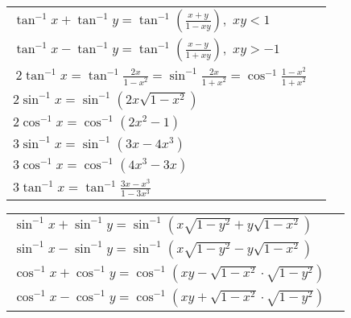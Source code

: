 \documentclass[Math.tex]{subfiles}
\begin{document}
\begin{tabular}{|l|N}
\hline
$\displaystyle\tan^{-1} x + \tan ^{-1} y = \tan ^{-1} \left(\frac{x+y}{1-xy}\right), \,\, xy < 1$ &\\[20pt]
$\displaystyle\tan^{-1} x - \tan ^{-1} y = \tan ^{-1} \left(\frac{x-y}{1+xy}\right), \,\, xy > -1$ &\\[20pt]
\hline
$\displaystyle\ 2\tan ^{-1} x = \tan ^{-1} \frac{2x}{1-x^2} = \sin ^{-1} \frac{2x}{1+x^2} = \cos ^{-1} \frac{1-x^2}{1+x^2}$ & \\[20 pt]
\hline
$2\sin ^{-1} x = \sin ^{-1}\left(2x\sqrt{1-x^2}\right)$ &\\[5pt]
$2\cos ^{-1} x = \cos ^{-1}\left(2x^2 - 1\right)$ & \\[5 pt]
$3\sin ^{-1} x = \sin ^{-1}\left(3x - 4x^3\right)$ &\\[5pt]
$3\cos ^{-1} x = \cos ^{-1}\left(4x^3 - 3x\right)$ &\\[5pt]
$\displaystyle3\tan ^{-1} x = \tan ^{-1}\frac{3x - x^3}{1-3x^3}$ &\\[15pt]
\hline
\end{tabular}
\begin{tabular}{|l|N}
\hline
$\sin ^{-1}x + \sin ^{-1}y = \sin ^{-1}\left(x\sqrt{1-y^2} + y\sqrt{1-x^2}\right)$ &\\[10pt]
$\sin ^{-1}x - \sin ^{-1}y = \sin ^{-1}\left(x\sqrt{1-y^2} - y\sqrt{1-x^2}\right)$ &\\[10pt]
$\cos ^{-1}x + \cos ^{-1}y = \cos ^{-1}\left(xy - \sqrt{1-x^2}\cdot\sqrt{1-y^2}\right)$ &\\[10pt]
$\cos ^{-1}x - \cos ^{-1}y = \cos ^{-1}\left(xy + \sqrt{1-x^2}\cdot\sqrt{1-y^2}\right)$ &\\[10pt]
\hline
\end{tabular}
\end{document}
